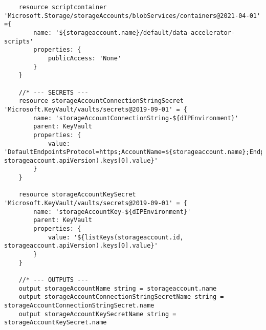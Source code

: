 \documentclass[dutch,dit,thesis]{hogentreport}
\begin{document}
\begin{lstlisting}
    resource scriptcontainer 'Microsoft.Storage/storageAccounts/blobServices/containers@2021-04-01' ={
        name: '${storageaccount.name}/default/data-accelerator-scripts'
        properties: {
            publicAccess: 'None'
        }
    }

    //* --- SECRETS ---
    resource storageAccountConnectionStringSecret 'Microsoft.KeyVault/vaults/secrets@2019-09-01' = {
        name: 'storageAccountConnectionString-${dIPEnvironment}'
        parent: KeyVault
        properties: {
            value: 'DefaultEndpointsProtocol=https;AccountName=${storageaccount.name};EndpointSuffix=${environment().suffixes.storage};AccountKey=${listKeys(storageaccount.id, storageaccount.apiVersion).keys[0].value}'
        }
    }

    resource storageAccountKeySecret 'Microsoft.KeyVault/vaults/secrets@2019-09-01' = {
        name: 'storageAccountKey-${dIPEnvironment}'
        parent: KeyVault
        properties: {
            value: '${listKeys(storageaccount.id, storageaccount.apiVersion).keys[0].value}'
        }
    }

    //* --- OUTPUTS ---
    output storageAccountName string = storageaccount.name
    output storageAccountConnectionStringSecretName string = storageAccountConnectionStringSecret.name
    output storageAccountKeySecretName string = storageAccountKeySecret.name
\end{lstlisting}
\end{document}

